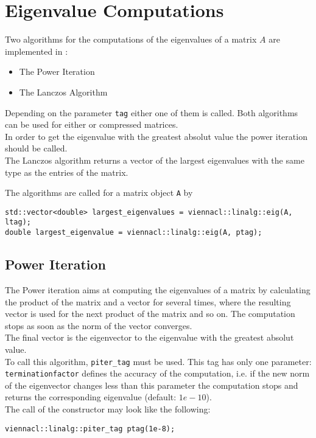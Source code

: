 \section{Eigenvalue Computations}
Two algorithms for the computations of the eigenvalues of a matrix $A$ are implemented in {\ViennaCL}:
\begin{itemize}
\item The Power Iteration \cite{golub:matrix-computations}
\item The Lanczos Algorithm \cite{simon:lanczos-pro}
\end{itemize}
Depending on the parameter \lstinline|tag| either one of them is called. 
Both algorithms can be used for either {\ublas} or {\ViennaCL} compressed matrices.\\
In order to get the eigenvalue with the greatest absolut value the power iteration should be called. \\
The Lanczos algorithm returns a vector of the largest eigenvalues with the same type as the entries of the matrix.

The algorithms are called for a matrix object \lstinline|A| by
\begin{lstlisting}
std::vector<double> largest_eigenvalues = viennacl::linalg::eig(A, ltag);
double largest_eigenvalue = viennacl::linalg::eig(A, ptag);
\end{lstlisting}


\subsection{Power Iteration}
The Power iteration aims at computing the eigenvalues of a matrix by calculating the product of the matrix and a vector for several times, where the resulting vector is used for the next product of the matrix and so on. The computation stops as soon as the norm of the vector converges. \\
The final vector is the eigenvector to the eigenvalue with the greatest absolut value.\\
To call this algorithm, \lstinline|piter_tag| must be used.
This tag has only one parameter: \\ \lstinline|terminationfactor| defines the accuracy of the computation, i.e. if the new norm of the eigenvector changes less than this parameter the computation stops and returns the corresponding eigenvalue (default: $1e-10$).\\
The call of the constructor may look like the following:
\begin{lstlisting} 
viennacl::linalg::piter_tag ptag(1e-8);
\end{lstlisting}

